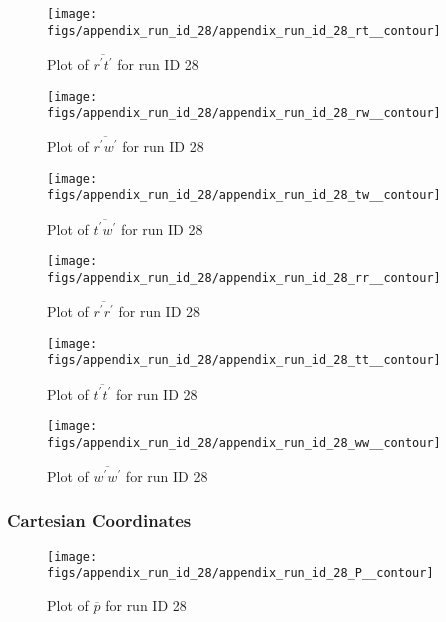 \begin{figure}[H]
\centering
\texttt{[image: figs/appendix\_run\_id\_28/appendix\_run\_id\_28\_rt\_\_contour]}
\caption{Plot of $\overline{r^\prime t^\prime}$ for run ID 28}
\label{fig:appendix_run_id_28_rt__contour}
\end{figure}


\begin{figure}[H]
\centering
\texttt{[image: figs/appendix\_run\_id\_28/appendix\_run\_id\_28\_rw\_\_contour]}
\caption{Plot of $\overline{r^\prime w^\prime}$ for run ID 28}
\label{fig:appendix_run_id_28_rw__contour}
\end{figure}


\begin{figure}[H]
\centering
\texttt{[image: figs/appendix\_run\_id\_28/appendix\_run\_id\_28\_tw\_\_contour]}
\caption{Plot of $\overline{t^\prime w^\prime}$ for run ID 28}
\label{fig:appendix_run_id_28_tw__contour}
\end{figure}


\begin{figure}[H]
\centering
\texttt{[image: figs/appendix\_run\_id\_28/appendix\_run\_id\_28\_rr\_\_contour]}
\caption{Plot of $\overline{r^\prime r^\prime}$ for run ID 28}
\label{fig:appendix_run_id_28_rr__contour}
\end{figure}


\begin{figure}[H]
\centering
\texttt{[image: figs/appendix\_run\_id\_28/appendix\_run\_id\_28\_tt\_\_contour]}
\caption{Plot of $\overline{t^\prime t^\prime}$ for run ID 28}
\label{fig:appendix_run_id_28_tt__contour}
\end{figure}


\begin{figure}[H]
\centering
\texttt{[image: figs/appendix\_run\_id\_28/appendix\_run\_id\_28\_ww\_\_contour]}
\caption{Plot of $\overline{w^\prime w^\prime}$ for run ID 28}
\label{fig:appendix_run_id_28_ww__contour}
\end{figure}


\subsubsection{Cartesian Coordinates}
\begin{figure}[H]
\centering
\texttt{[image: figs/appendix\_run\_id\_28/appendix\_run\_id\_28\_P\_\_contour]}
\caption{Plot of $\overline{p}$ for run ID 28}
\label{fig:appendix_run_id_28_P__contour}
\end{figure}


